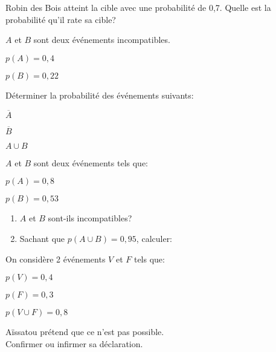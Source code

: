 \begin{exercice}
 Robin des Bois atteint la cible avec une probabilité de 0,7. Quelle est la probabilité qu'il rate sa cible?
\end{exercice}

\begin{exercice}
 $A$ et $B$ sont deux événements incompatibles.
 \begin{colitemize}{2}
 \item $p(A)=0,4$
 \item $p(B)=0,22$
 \end{colitemize} 
 Déterminer la probabilité des événements suivants: 
 \begin{colenumerate}{3}
  \item $\overline{A}$
  \item $\overline{B}$
   \item $A\cup B$
   \end{colenumerate}
\end{exercice}

\begin{exercice}
 $A$ et $B$ sont deux événements tels que:
 \begin{colitemize}{2}
 \item $p(A)=0,8$ \item $p(B)=0,53$
 \end{colitemize}
 \vspace{-1.5em}
  \begin{enumerate}
  \item $A$ et $B$ sont-ils incompatibles?
  \item Sachant que $p(A\cup B)=0,95$, calculer:
  \vspace{-1.5em}
 \end{enumerate}
\end{exercice}

\begin{exercice}
 On considère 2 événements $V$ et $F$ tels que:
 \begin{colitemize}{2}
 \item $p(V)=0,4$ \item $p(F)=0,3$ \item $p(V\cup F)=0,8$ 
 \end{colitemize}
 Aïssatou prétend que ce n'est pas possible. \\Confirmer ou infirmer sa déclaration. 
\end{exercice}

